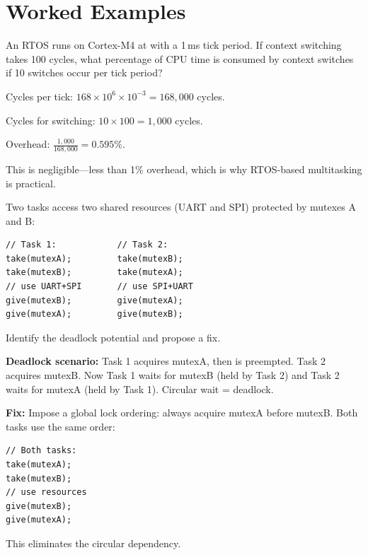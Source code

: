 \section{Worked Examples}
\label{sec:mt:examples}

\begin{example}
An RTOS runs on Cortex-M4 at  with a 1\,ms tick period. If context switching takes 100 cycles, what percentage of CPU time is consumed by context switches if 10 switches occur per tick period?

\begin{solution}
Cycles per tick: $168 \times 10^6 \times 10^{-3} = 168{,}000$ cycles.

Cycles for switching: $10 \times 100 = 1{,}000$ cycles.

Overhead: $\frac{1{,}000}{168{,}000} = 0.595\%$.

This is negligible---less than 1\% overhead, which is why RTOS-based multitasking is practical.
\end{solution}
\end{example}

\begin{example}
Two tasks access two shared resources (UART and SPI) protected by mutexes A and B:
\begin{lstlisting}[style=C, numbers=none]
// Task 1:            // Task 2:
take(mutexA);         take(mutexB);
take(mutexB);         take(mutexA);
// use UART+SPI       // use SPI+UART
give(mutexB);         give(mutexA);
give(mutexA);         give(mutexB);
\end{lstlisting}
Identify the deadlock potential and propose a fix.

\begin{solution}
\textbf{Deadlock scenario:} Task 1 acquires mutexA, then is preempted. Task 2 acquires mutexB. Now Task 1 waits for mutexB (held by Task 2) and Task 2 waits for mutexA (held by Task 1). Circular wait = deadlock.

\textbf{Fix:} Impose a global lock ordering: always acquire mutexA before mutexB. Both tasks use the same order:
\begin{lstlisting}[style=C, numbers=none]
// Both tasks:
take(mutexA);
take(mutexB);
// use resources
give(mutexB);
give(mutexA);
\end{lstlisting}
This eliminates the circular dependency.
\end{solution}
\end{example}

